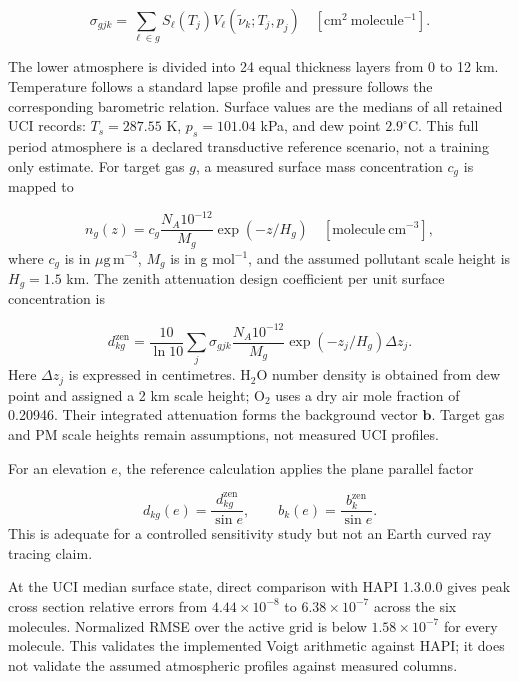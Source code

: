 \documentclass[conference]{IEEEtran}
\newcommand{\ugm}{\ensuremath{\mu\mathrm{g\,m}^{-3}}}
\begin{document}
\begin{equation}
\sigma_{gjk}=\sum_{\ell\in g}S_\ell(T_j)
V_\ell(\tilde{\nu}_k;T_j,p_j)
\quad [\mathrm{cm^2\ molecule^{-1}}].
\label{eq:crosssection}
\end{equation}

The lower atmosphere is divided into 24 equal thickness layers from 0 to 12 km. Temperature follows a standard lapse profile and pressure follows the corresponding barometric relation. Surface values are the medians of all retained UCI records: $T_s=287.55$ K, $p_s=101.04$ kPa, and dew point $2.9^\circ$C. This full period atmosphere is a declared transductive reference scenario, not a training only estimate. For target gas $g$, a measured surface mass concentration $c_g$ is mapped to

\begin{equation}
n_g(z)=c_g\frac{N_A10^{-12}}{M_g}\exp(-z/H_g)
\quad [\mathrm{molecule\ cm^{-3}}],
\label{eq:profile}
\end{equation}
where $c_g$ is in \ugm, $M_g$ is in g mol$^{-1}$, and the assumed pollutant scale height is $H_g=1.5$ km. The zenith attenuation design coefficient per unit surface concentration is

\begin{equation}
d^{\mathrm{zen}}_{kg}=\frac{10}{\ln 10}
\sum_j \sigma_{gjk}\frac{N_A10^{-12}}{M_g}
\exp(-z_j/H_g)\Delta z_j.
\label{eq:gasdesign}
\end{equation}
Here $\Delta z_j$ is expressed in centimetres. H$_2$O number density is obtained from dew point and assigned a 2 km scale height; O$_2$ uses a dry air mole fraction of 0.20946. Their integrated attenuation forms the background vector $\boldsymbol b$. Target gas and PM scale heights remain assumptions, not measured UCI profiles.

For an elevation $e$, the reference calculation applies the plane parallel factor

\begin{equation}
d_{kg}(e)=\frac{d^{\mathrm{zen}}_{kg}}{\sin e}, \qquad
b_k(e)=\frac{b_k^{\mathrm{zen}}}{\sin e}.
\label{eq:slant}
\end{equation}
This is adequate for a controlled sensitivity study but not an Earth curved ray tracing claim.

At the UCI median surface state, direct comparison with HAPI 1.3.0.0 gives peak cross section relative errors from $4.44\times10^{-8}$ to $6.38\times10^{-7}$ across the six molecules. Normalized RMSE over the active grid is below $1.58\times10^{-7}$ for every molecule. This validates the implemented Voigt arithmetic against HAPI; it does not validate the assumed atmospheric profiles against measured columns.
\end{document}
